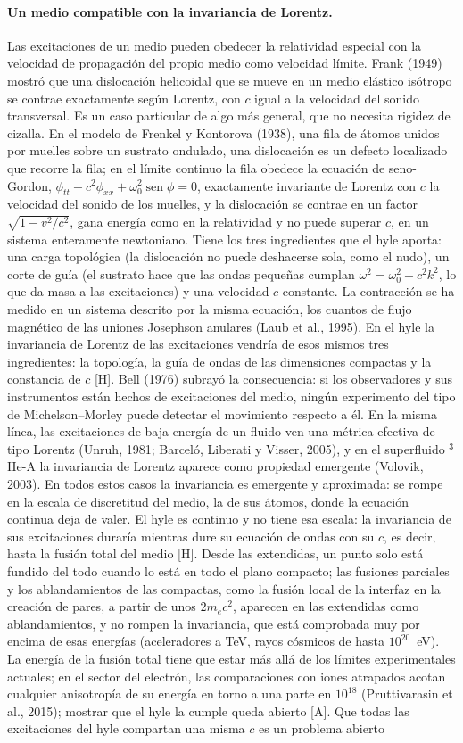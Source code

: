\documentclass[11pt,a4paper]{article}
\newcommand{\st}[1]{\textup{[#1]}}
\newcommand{\apartado}[1]{\paragraph{#1}}
\begin{document}
\apartado{Un medio compatible con la invariancia de Lorentz.} Las excitaciones de un medio pueden obedecer la relatividad especial con la velocidad de propagación del propio medio como velocidad límite. Frank (1949) mostró que una dislocación helicoidal que se mueve en un medio elástico isótropo se contrae exactamente según Lorentz, con $c$ igual a la velocidad del sonido transversal. Es un caso particular de algo más general, que no necesita rigidez de cizalla. En el modelo de Frenkel y Kontorova (1938), una fila de átomos unidos por muelles sobre un sustrato ondulado, una dislocación es un defecto localizado que recorre la fila; en el límite continuo la fila obedece la ecuación de seno-Gordon, $\phi_{tt}-c^2\phi_{xx}+\omega_0^2\operatorname{sen}\phi=0$, exactamente invariante de Lorentz con $c$ la velocidad del sonido de los muelles, y la dislocación se contrae en un factor $\sqrt{1-v^2/c^2}$, gana energía como en la relatividad y no puede superar $c$, en un sistema enteramente newtoniano. Tiene los tres ingredientes que el hyle aporta: una carga topológica (la dislocación no puede deshacerse sola, como el nudo), un corte de guía (el sustrato hace que las ondas pequeñas cumplan $\omega^2=\omega_0^2+c^2k^2$, lo que da masa a las excitaciones) y una velocidad $c$ constante. La contracción se ha medido en un sistema descrito por la misma ecuación, los cuantos de flujo magnético de las uniones Josephson anulares (Laub et al., 1995). En el hyle la invariancia de Lorentz de las excitaciones vendría de esos mismos tres ingredientes: la topología, la guía de ondas de las dimensiones compactas y la constancia de $c$ \st{H}. Bell (1976) subrayó la consecuencia: si los observadores y sus instrumentos están hechos de excitaciones del medio, ningún experimento del tipo de Michelson--Morley puede detectar el movimiento respecto a él. En la misma línea, las excitaciones de baja energía de un fluido ven una métrica efectiva de tipo Lorentz (Unruh, 1981; Barceló, Liberati y Visser, 2005), y en el superfluido ${}^3$He-A la invariancia de Lorentz aparece como propiedad emergente (Volovik, 2003). En todos estos casos la invariancia es emergente y aproximada: se rompe en la escala de discretitud del medio, la de sus átomos, donde la ecuación continua deja de valer. El hyle es continuo y no tiene esa escala: la invariancia de sus excitaciones duraría mientras dure su ecuación de ondas con su $c$, es decir, hasta la fusión total del medio \st{H}. Desde las extendidas, un punto solo está fundido del todo cuando lo está en todo el plano compacto; las fusiones parciales y los ablandamientos de las compactas, como la fusión local de la interfaz en la creación de pares, a partir de unos $2m_ec^2$, aparecen en las extendidas como ablandamientos, y no rompen la invariancia, que está comprobada muy por encima de esas energías (aceleradores a TeV, rayos cósmicos de hasta $10^{20}$~eV). La energía de la fusión total tiene que estar más allá de los límites experimentales actuales; en el sector del electrón, las comparaciones con iones atrapados acotan cualquier anisotropía de su energía en torno a una parte en $10^{18}$ (Pruttivarasin et al., 2015); mostrar que el hyle la cumple queda abierto \st{A}. Que todas las excitaciones del hyle compartan una misma $c$ es un problema abierto 
\end{document}

